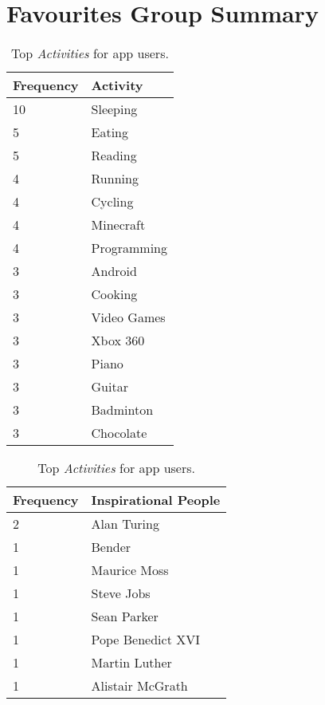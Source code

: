 
\appendix
\chapter{Favourites Group Summary}

\label{app:app1}
\begin{table}[h]
\begin{minipage}[b]{.50\textwidth}
\centering
  \begin{tabular}{|l|l|} %
  \hline
  		\textbf{Frequency} & \textbf{Activity} \\ \hline
  		10 & Sleeping \\ \hline
		5 & Eating \\ \hline
		5 & Reading \\ \hline
		4 & Running \\ \hline
		4 & Cycling \\ \hline
		4 & Minecraft \\ \hline
		4 & Programming \\ \hline
		3 & Android \\ \hline
		3 & Cooking \\ \hline
		3 & Video Games \\ \hline
		3 & Xbox 360 \\ \hline
		3 & Piano \\ \hline
		3 & Guitar \\ \hline
		3 & Badminton \\ \hline
		3 & Chocolate \\ \hline
  \end{tabular}
  \caption{Top \emph{Activities} for app users.}  
\end{minipage}
\begin{minipage}[b]{.50\textwidth}
\centering
  \begin{tabular}{|l|l|} %
  \hline
  		\textbf{Frequency} & \textbf{Inspirational People} \\ \hline
  		2 & Alan Turing \\ \hline
		1 & Bender \\ \hline
		1 & Maurice Moss \\ \hline
		1 & Steve Jobs \\ \hline
		1 & Sean Parker \\ \hline
		1 & Pope Benedict XVI \\ \hline
		1 & Martin Luther \\ \hline
		1 & Alistair McGrath \\ \hline

\end{tabular}
\end{minipage}
\end{table}
